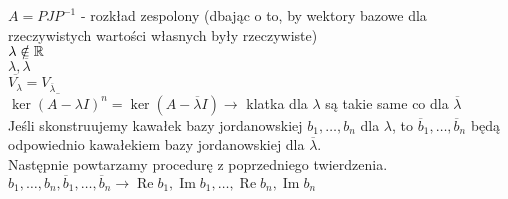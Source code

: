 \begin{dd} 
    $A = PJP^{-1}$ - rozkład zespolony (dbając o to, by wektory bazowe dla rzeczywistych
    wartości własnych były rzeczywiste) \\ 
    $ \lambda \notin \mathbb{R}$ \\ 
    $ \lambda, \overline \lambda$ \\ 
    $\overline {V_\lambda} = V_{\overline\lambda}$ \\ 
    $\overline{\ker (A-\lambda I)^n} = \ker (A - \overline\lambda I) \to $ klatka dla 
    $\lambda$ są takie same co dla $\overline \lambda$ \\ 
    Jeśli skonstruujemy kawałek bazy jordanowskiej $b_1,\ldots,b_n$ dla $\lambda$, to 
    $\overline b_1,\ldots,\overline b_n$ będą odpowiednio kawałekiem bazy jordanowskiej dla
    $\overline \lambda$. \\ 
    Następnie powtarzamy procedurę z poprzedniego twierdzenia. \\ 
    $b_1,\ldots,b_n,\overline b_1,\ldots,\overline b_n \to 
    \operatorname{Re} b_1, \operatorname{Im} b_1,\ldots,\operatorname{Re}b_n,
    \operatorname{Im} b_n$ 
\end{dd} 
